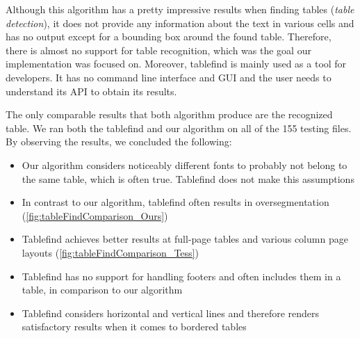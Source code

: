 Although this algorithm has a pretty impressive results when finding tables (\emph{table detection}), it does not provide any information about the text in various cells and has no output except for a bounding box around the found table. Therefore, there is almost no support for table recognition, which was the goal our implementation was focused on. Moreover, tablefind is mainly used as a tool for developers. It has no command line interface and GUI and the user needs to understand its API to obtain its results.

The only comparable results that both algorithm produce are the recognized table. We ran both the tablefind and our algorithm on all of the 155 testing files. By observing the results, we concluded the following:
\begin{itemize}
    \item Our algorithm considers noticeably different fonts to probably not belong to the same table, which is often true. Tablefind does not make this assumptions
    \item In contrast to our algorithm, tablefind often results in oversegmentation (\cref{fig:tableFindComparison_Ours})
    \item Tablefind achieves better results at full-page tables and various column page layouts (\cref{fig:tableFindComparison_Tess})
    \item Tablefind has no support for handling footers and often includes them in a table, in comparison to our algorithm
    \item Tablefind considers horizontal and vertical lines and therefore renders satisfactory results when it comes to bordered tables
\end{itemize}

